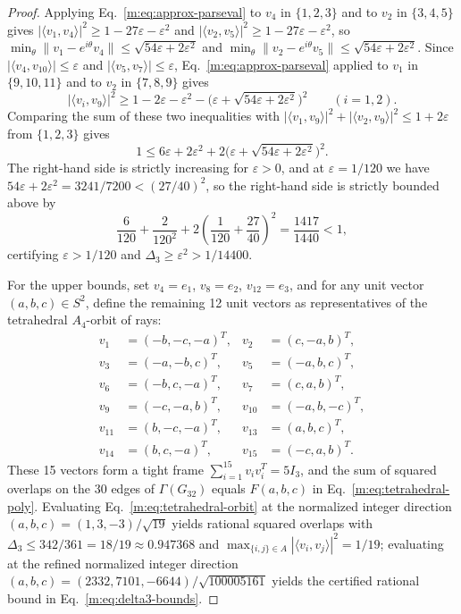 \documentclass[aps,pra,reprint,superscriptaddress,longbibliography,nofootinbib,floatfix,10pt]{revtex4-2}
\theoremstyle{definition}
\begin{document}
\begin{proof}
Applying Eq.~\eqref{m:eq:approx-parseval} to $v_4$ in $\{1,2,3\}$ and to $v_2$ in
$\{3,4,5\}$ gives $|\langle v_1,v_4\rangle|^2\ge 1-27\varepsilon-\varepsilon^2$
and $|\langle v_2,v_5\rangle|^2\ge 1-27\varepsilon-\varepsilon^2$, so
$\min_\theta\|v_1-e^{i\theta}v_4\|\le\sqrt{54\varepsilon+2\varepsilon^2}$ and
$\min_\theta\|v_2-e^{i\theta}v_5\|\le\sqrt{54\varepsilon+2\varepsilon^2}$.
Since $|\langle v_4,v_{10}\rangle|\le\varepsilon$ and
$|\langle v_5,v_7\rangle|\le\varepsilon$, Eq.~\eqref{m:eq:approx-parseval}
applied to $v_1$ in $\{9,10,11\}$ and to $v_2$ in $\{7,8,9\}$ gives
\[
|\langle v_i,v_9\rangle|^2 \ge 1 - 2\varepsilon - \varepsilon^2
- \bigl(\varepsilon+\sqrt{54\varepsilon+2\varepsilon^2}\bigr)^2
\qquad (i=1,2).
\]
Comparing the sum of these two inequalities with
$|\langle v_1,v_9\rangle|^2+|\langle v_2,v_9\rangle|^2\le 1+2\varepsilon$ from
$\{1,2,3\}$ gives
\[
1 \le 6\varepsilon + 2\varepsilon^2
+ 2\bigl(\varepsilon+\sqrt{54\varepsilon+2\varepsilon^2}\bigr)^2.
\]
The right-hand side is strictly increasing for $\varepsilon>0$, and at
$\varepsilon=1/120$ we have
$54\varepsilon+2\varepsilon^2 = 3241/7200 < (27/40)^2$, so the right-hand side
is strictly bounded above by
\[
\frac{6}{120} + \frac{2}{120^2}
+ 2\left(\frac{1}{120}+\frac{27}{40}\right)^2 = \frac{1417}{1440} < 1,
\]
certifying $\varepsilon > 1/120$ and $\Delta_3 \ge \varepsilon^2 > 1/14400$.

For the upper bounds, set $v_4=e_1$, $v_8=e_2$, $v_{12}=e_3$, and for any unit
vector $(a,b,c)\in S^2$, define the remaining 12 unit vectors as representatives
of the tetrahedral $A_4$-orbit of rays:
\begin{equation}\label{m:eq:tetrahedral-orbit}
\begin{aligned}
v_1&=(-b,-c,-a)^T,& v_2&=(c,-a,b)^T,\\
v_3&=(-a,-b,c)^T,& v_5&=(-a,b,c)^T,\\
v_6&=(-b,c,-a)^T,& v_7&=(c,a,b)^T,\\
v_9&=(-c,-a,b)^T,& v_{10}&=(-a,b,-c)^T,\\
v_{11}&=(b,-c,-a)^T,& v_{13}&=(a,b,c)^T,\\
v_{14}&=(b,c,-a)^T,& v_{15}&=(-c,a,b)^T.
\end{aligned}
\end{equation}
These 15 vectors form a tight frame $\sum_{i=1}^{15}v_i v_i^T = 5I_3$, and the
sum of squared overlaps on the 30 edges of $\Gamma(G_{32})$ equals $F(a,b,c)$ in
Eq.~\eqref{m:eq:tetrahedral-poly}. Evaluating Eq.~\eqref{m:eq:tetrahedral-orbit} at
the normalized integer direction $(a,b,c)=(1,3,-3)/\sqrt{19}$ yields rational
squared overlaps with $\Delta_3\le 342/361 = 18/19\approx 0.947368$ and
$\max_{\{i,j\}\in A}|\langle v_i,v_j\rangle|^2=1/19$; evaluating at the refined
normalized integer direction
$(a,b,c)=(2332,7101,-6644)/\sqrt{100005161}$ yields the certified rational
bound in Eq.~\eqref{m:eq:delta3-bounds}.
\end{proof}
\end{document}
